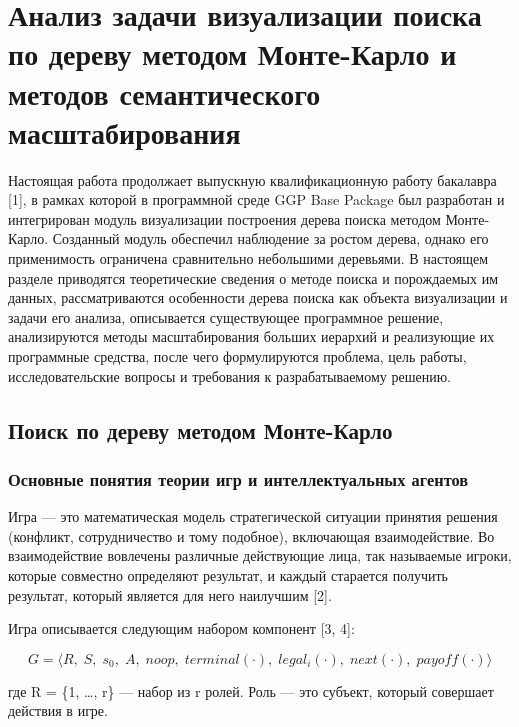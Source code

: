\section{Анализ задачи визуализации поиска по дереву методом Монте-Карло и методов семантического масштабирования}

Настоящая работа продолжает выпускную квалификационную работу бакалавра [1], в рамках которой в программной среде GGP Base Package был разработан и интегрирован модуль визуализации построения дерева поиска методом Монте-Карло. Созданный модуль обеспечил наблюдение за ростом дерева, однако его применимость ограничена сравнительно небольшими деревьями. В настоящем разделе приводятся теоретические сведения о методе поиска и порождаемых им данных, рассматриваются особенности дерева поиска как объекта визуализации и задачи его анализа, описывается существующее программное решение, анализируются методы масштабирования больших иерархий и реализующие их программные средства, после чего формулируются проблема, цель работы, исследовательские вопросы и требования к разрабатываемому решению.

\subsection{Поиск по дереву методом Монте-Карло}

\subsubsection{Основные понятия теории игр и интеллектуальных агентов}

Игра — это математическая модель стратегической ситуации принятия решения (конфликт, сотрудничество и тому подобное), включающая взаимодействие. Во взаимодействие вовлечены различные действующие лица, так называемые игроки, которые совместно определяют результат, и каждый старается получить результат, который является для него наилучшим [2].

Игра описывается следующим набором компонент [3, 4]:

\begin{equation}
G = \langle R,\; S,\; s_0,\; A,\; noop,\; terminal(\cdot),\; legal_i(\cdot),\; next(\cdot),\; payoff(\cdot) \rangle
\end{equation}

где R = \{1, …, r\} — набор из r ролей. Роль — это субъект, который совершает действия в игре.

